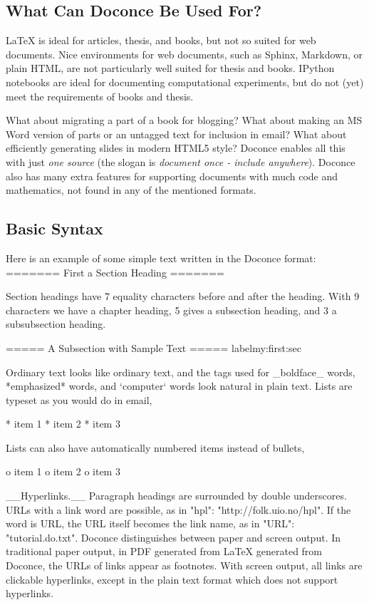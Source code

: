 \documentclass[%
oneside,                 %
final,                   %
10pt]{article}
\begin{document}
\noindent
\subsection{What Can Doconce Be Used For?}

{\LaTeX} is ideal for articles, thesis, and books, but not so suited
for web documents. Nice environments for web documents, such as
Sphinx, Markdown, or plain HTML, are not particularly well
suited for thesis and books. IPython notebooks are ideal for
documenting computational experiments, but do not (yet) meet the
requirements of books and thesis.

What about migrating a part of a book for blogging? What about making
an MS Word version of parts or an untagged text for inclusion in
email?  What about efficiently generating slides in modern HTML5
style?  Doconce enables all this with just \emph{one source} (the slogan is
\emph{document once - include anywhere}).
Doconce also
has many extra features for supporting documents with much code and
mathematics, not found in any of the mentioned formats.

\subsection{Basic Syntax}

Here is an example of some simple text written in the Doconce format:
\bccq
======= First a Section Heading =======

Section headings have 7 equality characters before and after the heading.
With 9 characters we have a chapter heading, 5 gives a subsection
heading, and 3 a subsubsection heading.

===== A Subsection with Sample Text =====
label{my:first:sec}

Ordinary text looks like ordinary text, and the tags used for
_boldface_ words, *emphasized* words, and `computer` words look
natural in plain text.  Lists are typeset as you would do in email,

  * item 1
  * item 2
  * item 3

Lists can also have automatically numbered items instead of bullets,

  o item 1
  o item 2
  o item 3

__Hyperlinks.__ Paragraph headings are surrounded by double underscores.
URLs with a link word are possible, as in "hpl": "http://folk.uio.no/hpl".
If the word is URL, the URL itself becomes the link name,
as in "URL": "tutorial.do.txt". Doconce distinguishes between paper
and screen output. In traditional paper output, in PDF generated from LaTeX
generated from Doconce, the URLs of links appear as footnotes.
With screen output, all links are clickable hyperlinks, except in
the plain text format which does not support hyperlinks.
\end{document}

